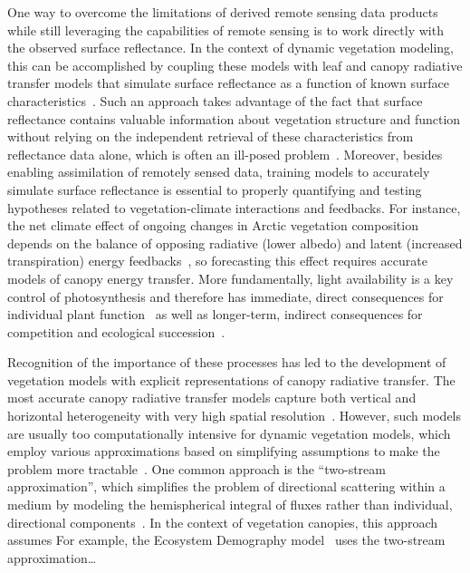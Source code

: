 One way to overcome the limitations of derived remote sensing data products while still leveraging the capabilities of remote sensing is to work directly with the observed surface reflectance.
In the context of dynamic vegetation modeling, this can be accomplished by coupling these models with leaf and canopy radiative transfer models that simulate surface reflectance as a function of known surface characteristics~\cite{quaife_2008_assimilating}.
% 
% 
Such an approach takes advantage of the fact that surface reflectance contains valuable information about vegetation structure and function without relying on the independent retrieval of these characteristics from reflectance data alone, which is often an ill-posed problem~\cite{combal_2003_retrieval,lewis_2007_spectral}.
Moreover, besides enabling assimilation of remotely sensed data, training models to accurately simulate surface reflectance is essential to properly quantifying and testing hypotheses related to vegetation-climate interactions and feedbacks.
For instance, the net climate effect of ongoing changes in Arctic vegetation composition depends on the balance of opposing radiative (lower albedo) and latent (increased transpiration) energy feedbacks~\cite{Swann_2010_changes}, so forecasting this effect requires accurate models of canopy energy transfer.
More fundamentally, light availability is a key control of photosynthesis and therefore has
immediate, direct consequences for individual plant function~\cite{hikosaka_1995_model,robakowski_2004_needle,Niinemets_2016_within,Keenan_2016_global}
as well as longer-term, indirect consequences for competition and ecological succession~\cite{Niinemets_2006_tolerance,Kitajima_2013_leaf,Falster_2017_multitrait}.

Recognition of the importance of these processes has led to the development of vegetation models with explicit representations of canopy radiative transfer.
The most accurate canopy radiative transfer models capture both vertical and horizontal heterogeneity with very high spatial resolution~\cite{widlowski_2007_third}.
However, such models are usually too computationally intensive for dynamic vegetation models, which employ various approximations based on simplifying assumptions to make the problem more tractable~\cite{fisher_2017_vegetation}.
One common approach is the ``two-stream approximation'', which simplifies the problem of directional scattering within a medium by modeling the hemispherical integral of fluxes rather than individual, directional components~\cite{meador_1980_twostream}.
In the context of vegetation canopies, this approach assumes
For example, the Ecosystem Demography model~\cite[ED2][]{Moorcroft_2001_ED,Medvigy_2009_ED2} uses the two-stream approximation\ldots

